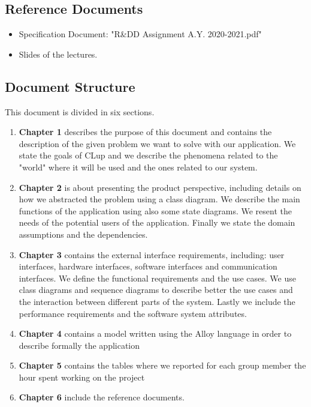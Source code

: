 \subsection{Reference Documents}

\begin{itemize}
    \item Specification Document: "R\&DD Assignment A.Y. 2020-2021.pdf"
    \item Slides of the lectures.
\end{itemize}

\subsection{Document Structure}
This document is divided in six sections.
\begin{enumerate}
    \item \textbf{Chapter 1} describes the purpose of this document and contains the description of the given problem we want to solve with our application. We state the goals of CLup and we describe the phenomena related to the "world" where it will be used and the ones related to our system.
    
    \item \textbf{Chapter 2} is about presenting the product perspective, including details on how we abstracted the problem using a class diagram. We describe the main functions of the application using also some state diagrams. We resent the needs of the potential users of the application. Finally we state the domain assumptions and the dependencies.
    
    \item \textbf{Chapter 3} contains the external interface requirements, including: user interfaces, hardware interfaces, software interfaces and communication interfaces. We define the functional requirements and the use cases. We use class diagrams and sequence diagrams to describe better the use cases and the interaction between different parts of the system.  Lastly we include the performance requirements and the software system attributes.
    
    \item \textbf{Chapter 4} contains a model written using the Alloy language in order to describe formally the application
    
    \item \textbf{Chapter 5} contains the tables where we reported for each group member the hour spent working on the project
    
    \item \textbf{Chapter 6} include the reference documents.
 \end{enumerate}

\vfill